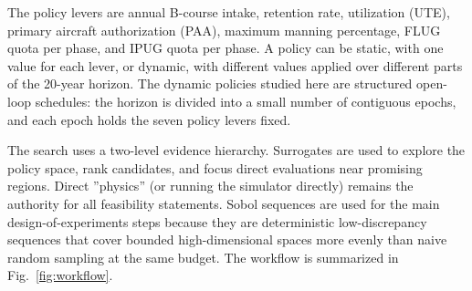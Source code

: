 \documentclass[10pt]{article}
\begin{document}
The policy levers are annual B-course intake, retention rate, utilization
(UTE), primary aircraft authorization (PAA), maximum manning percentage, FLUG
quota per phase, and IPUG quota per phase. A policy can be static, with one
value for each lever, or dynamic, with different values applied over different
parts of the 20-year horizon. The dynamic policies studied here are structured
open-loop schedules: the horizon is divided into a small number of contiguous
epochs, and each epoch holds the seven policy levers fixed.

The search uses a two-level evidence hierarchy. Surrogates are used to explore
the policy space, rank candidates, and focus direct evaluations near promising
regions. Direct ''physics'' (or running the simulator directly) remains the authority for all feasibility statements.
Sobol sequences are used for the main design-of-experiments steps because they
are deterministic low-discrepancy sequences that cover bounded
high-dimensional spaces more evenly than naive random sampling at the same
budget. The workflow is summarized in Fig.~\ref{fig:workflow}.
\end{document}
